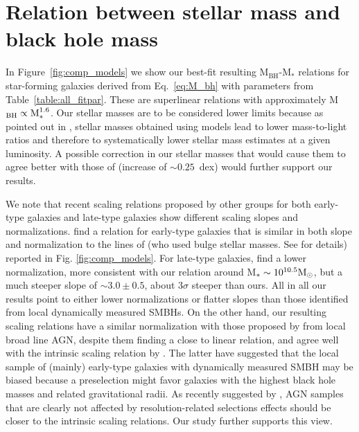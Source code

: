 

\section{Relation between stellar mass and black hole mass} \label{sec:M_vs_M}
In Figure~\ref{fig:comp_models} we show our best-fit resulting M$_\text{BH}$-M$_*$ relations for star-forming galaxies derived from Eq.~\ref{eq:M_bh} with parameters from Table~\ref{table:all_fitpar}. These are superlinear relations with approximately M$_{\rm BH}\propto\text{M}_*^{1.6}$.
Our stellar masses are to be considered lower limits because as pointed out in \citet{2003ApJ...585L.117B}, stellar masses obtained using \citet{2003MNRAS.344.1000B} models lead to lower mass-to-light ratios and therefore to systematically lower stellar mass estimates at a given luminosity. A possible correction in our stellar masses that would cause them to agree better with those of \citet{2003ApJ...585L.117B} (increase of $\sim0.25$~dex) would further support our results.

We note that recent scaling relations proposed by other groups for both early-type galaxies and late-type galaxies show different scaling slopes and normalizations. \citet{2019ApJ...876..155S} find a relation for early-type galaxies that is similar in both slope and normalization to the lines of \citeauthor{2016ApJS..222...10S} (who used bulge stellar masses. See \citet{2016MNRAS.460.3119S, 2019MNRAS.485.1278S} for details) reported in Fig. \ref{fig:comp_models}. For late-type galaxies, \citet{2019ApJ...876..155S} find a lower normalization, more consistent with our relation around M$_*\sim 10^{10.5}{\rm M}_\odot$, but a much steeper slope of $\sim3.0\pm 0.5$, about $3\sigma$ steeper than ours. All in all our results point to either lower normalizations or flatter slopes than those identified from local dynamically measured SMBHs.
On the other hand, our resulting scaling relations have a similar normalization with those proposed by \citet{2015ApJ...813...82R} from local broad line AGN, despite them finding a close to linear relation, and agree well with 
the intrinsic scaling relation by \citet{2016MNRAS.460.3119S}. The latter have suggested that the local sample of (mainly) early-type galaxies with dynamically measured SMBH may be biased because a preselection might favor galaxies with the highest black hole masses and related gravitational radii. As recently suggested by \citet{2019MNRAS.485.1278S}, AGN samples that are clearly not affected by resolution-related selections effects should be closer to the intrinsic scaling relations. Our study further supports this view. 

